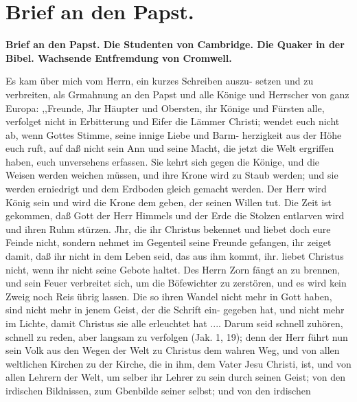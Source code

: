 
\chapter[Brief an den Papst.]{Brief an den Papst.}

\begin{center}
\textbf{Brief an den Papst. Die Studenten von Cambridge. Die Quaker
in der Bibel. Wachsende Entfremdung von Cromwell.}
\end{center}

Es kam über mich vom Herrn, ein kurzes Schreiben auszu-
setzen und zu verbreiten, als Grmahnung an den Papst und alle
Könige und Herrscher von ganz Europa:
,,Freunde,
Jhr Häupter und Obersten, ihr Könige und Fürsten alle,
verfolget nicht in Erbitterung und Eifer die Lämmer Christi; wendet
euch nicht ab, wenn Gottes Stimme, seine innige Liebe und Barm-
herzigkeit aus der Höhe euch ruft, auf daß nicht sein Ann und
seine Macht, die jetzt die Welt ergriffen haben, euch unversehens
erfassen. Sie kehrt sich gegen die Könige, und die Weisen werden
weichen müssen, und ihre Krone wird zu Staub werden; und sie
werden erniedrigt und dem Erdboden gleich gemacht werden. Der
Herr wird König sein und wird die Krone dem geben, der seinen
Willen tut. Die Zeit ist gekommen, daß Gott der Herr Himmels
und der Erde die Stolzen entlarven wird und ihren Ruhm stürzen.
Jhr, die ihr Christus bekennet und liebet doch eure Feinde nicht,
sondern nehmet im Gegenteil seine Freunde gefangen, ihr zeiget
damit, daß ihr nicht in dem Leben seid, das aus ihm kommt, ihr.
liebet Christus nicht, wenn ihr nicht seine Gebote haltet. Des
Herrn Zorn fängt an zu brennen, und sein Feuer verbreitet
sich, um die Böfewichter zu zerstören, und es wird kein Zweig
noch Reis übrig lassen. Die so ihren Wandel nicht mehr in
Gott haben, sind nicht mehr in jenem Geist, der die Schrift ein-
gegeben hat, und nicht mehr im Lichte, damit Christus sie alle
erleuchtet hat .... Darum seid schnell zuhören, schnell zu reden,
aber langsam zu verfolgen (Jak. 1, 19); denn der Herr führt nun
sein Volk aus den Wegen der Welt zu Christus dem wahren
Weg, und von allen weltlichen Kirchen zu der Kirche, die in ihm,
dem Vater Jesu Christi, ist, und von allen Lehrern der Welt,
um selber ihr Lehrer zu sein durch seinen Geist; von den irdischen
Bildnissen, zum Gbenbilde seiner selbst; und von den irdischen


